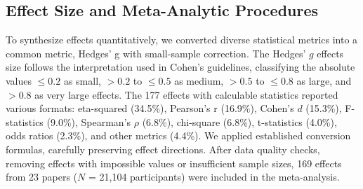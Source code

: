 \documentclass[manuscript,anonymous,sigconf]{acmart}
\begin{document}


\subsection{Effect Size and Meta-Analytic Procedures}

To synthesize effects quantitatively, we converted diverse statistical metrics into a common metric, Hedges' g with small-sample correction. The Hedges' $g$ effects size follows the interpretation used in Cohen's \cite{cohen2013statistical} guidelines, classifying the absolute values $\leq0.2$ as small, $>0.2$ to $\leq0.5$ as medium, $>0.5$ to $\leq0.8$ as large, and $>0.8$ as very large effects. The 177 effects with calculable statistics reported various formats: eta-squared (34.5\%), Pearson's r (16.9\%), Cohen's $d$ (15.3\%), F-statistics (9.0\%), Spearman's $\rho$ (6.8\%), chi-square (6.8\%), t-statistics (4.0\%), odds ratios (2.3\%), and other metrics (4.4\%). We applied established conversion formulas, carefully preserving effect directions. After data quality checks, removing effects with impossible values or insufficient sample sizes, 169 effects from 23 papers ($N$ = 21,104 participants) were included in the meta-analysis.
\end{document}
